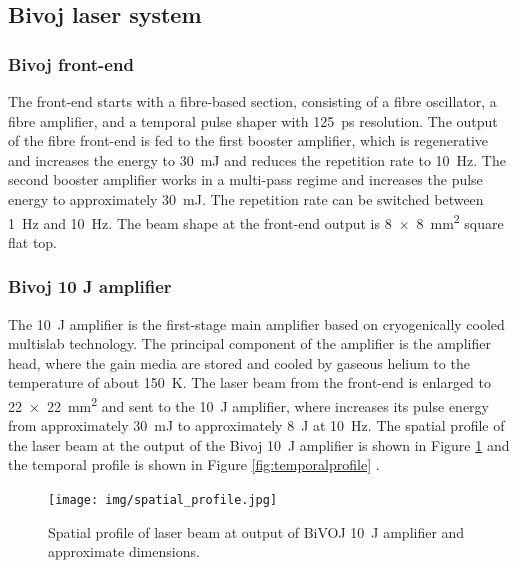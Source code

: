 \subsection{Bivoj laser system}

\subsubsection*{Bivoj front-end}

The front-end starts with a fibre-based section, consisting
of a fibre oscillator, a fibre amplifier, and a temporal pulse shaper
with \SI{125}{\ps} resolution. The output of the fibre front-end is fed
to the first booster amplifier, which is regenerative and
increases the energy to \SI{30}{\milli\joule} and reduces the repetition rate to \SI{10}{\hertz}. The second booster amplifier works in a multi-pass regime
and increases the pulse energy to approximately \SI{30}{\milli\joule}.
The repetition rate can be switched between \SI{1}{\hertz} and \SI{10}{\hertz}. The
beam shape at the front-end output is \SI{8 x 8}{\mm\squared} square flat top.

\subsubsection*{Bivoj 10 J amplifier}

The \SI{10}{\joule}  amplifier is the first-stage main amplifier based on
cryogenically cooled multislab technology. The principal
component of the amplifier is the amplifier head, where the
gain media are stored and cooled by gaseous helium to 
the temperature of about \SI{150}{\kelvin}. The laser beam from the front-end
is enlarged to \SI{22 x 22}{\mm\squared} and sent to the \SI{10}{\joule} amplifier, where
increases its pulse energy from approximately \SI{30}{\milli\joule} to
approximately \SI{8}{\joule} at \SI{10}{\hertz}. The spatial profile of the laser beam at the output of the Bivoj \SI{10}{\joule} amplifier is shown in Figure \ref{fig:spatialprofile} and the temporal profile is shown in Figure \ref{fig:temporalprofile} \cite{saumyabrata}.

\begin{figure}[h]
    \centering
    \texttt{[image: img/spatial\_profile.jpg]}
    \caption{Spatial profile of laser beam at output of BiVOJ \SI{10}{\joule} amplifier and approximate dimensions.}
    \label{fig:spatialprofile}
\end{figure}

